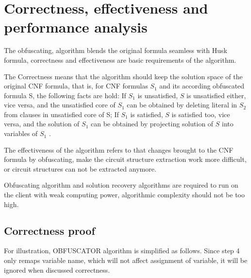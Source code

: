 \documentclass[runningheads,a4paper]{llncs}
\begin{document}
\section{Correctness, effectiveness and performance analysis}

The obfuscating, algorithm blends the original formula seamless with Husk formula, correctness and effectiveness are basic requirements of the algorithm. 

The Correctness means that the algorithm should keep the solution space of the original CNF formula, that is, for CNF formulas $S_1$  and its according obfuscated formula S, 
the following facts are hold: If $S_1$  is unsatisfied, $S$ is unsatisfied either, vice versa, and the unsatisfied core of $S_1$  can be obtained by deleting literal in $S_2$  from clauses in unsatisfied core of S;
If $S_1$  is satisfied, $S$ is satisfied too, vice versa, and the solution of $S_1$  can be obtained by projecting solution of $S$ into variables of $S_1$ . 

The effectiveness of the algorithm refers to that changes brought to the CNF formula by obfuscating, make the circuit structure extraction work more difficult, 
or circuit structures can not be extracted anymore. 

Obfuscating algorithm and solution recovery algorithms are required to run on the client with weak computing power, algorithmic complexity should not be too high.
\subsection{Correctness proof}

For illustration, OBFUSCATOR algorithm is simplified as follows. Since step 4 only remaps variable name, which will not affect assignment of variable, 
it will be ignored when discussed correctness.
\end{document}

